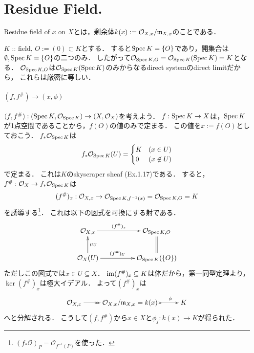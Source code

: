 \documentclass[a4paper]{jsarticle}
\newcommand{\shO}{\mathcal{O}}
\begin{document}
\section{Residue Field.} %
    Residue field of $x$ on $X$とは，剰余体$k(x):=\shO_{X,x}/\I{m}_{X,x}$のことである．

    $K$ :: field, $O:=(0) \subset K$とする．
    すると$\operatorname{Spec} K=\{O\}$であり，開集合は$\emptyset, \operatorname{Spec} K=\{O\}$の二つのみ．
    したがって$\shO_{\Spec K, O}=\shO_{\Spec K}(\Spec K)=K$となる．
    $\shO_{\Spec K, O}$は$\shO_{\Spec K}(\Spec K)$のみからなるdirect systemのdirect limitだから，
    これらは厳密に等しい．
    
    \paragraph{$(f,f^{\#}) \to (x, \phi)$}
    $(f, f^{\#}): (\Spec K, \shO_{\Spec K}) \to (X, \shO_X)$を考えよう．
    $f: \operatorname{Spec} K \to X$は，$\operatorname{Spec} K$が1点空間であることから，$f(O)$の値のみで定まる．
    この値を$x:=f(O)$としておこう．
    $f_* \shO_{\Spec K}$は
    \[
        f_* \shO_{\Spec K}(U)=
        \begin{cases}{}
            K & (x \in U) \\
            0 & (x \not \in U)
        \end{cases}
    \]
    で定まる．
    これは$K$のskyscraper sheaf (Ex.1.17)である．
    すると，$f^{\#}: \shO_X \to f_* \shO_{\Spec K}$は
    \[ (f^{\#})_{x}: \shO_{X,x} \to \shO_{\Spec K,f^{-1}(x)}=\shO_{\Spec K,O}=K \]
    を誘導する\footnote{$(f_* \shO)_P=\shO_{f^{-1}(P)}$を使った．}．
    これは以下の図式を可換にする射である．
    \[
    \xymatrix@C=5em
    {
    \shO_{X,x} \ar[r]^-{(f^{\#})_{x}} & \shO_{\Spec K,O} \\
    \shO_X(U) \ar[r]^-{(f^{\#})_U} \ar[u]_-{\mu_U} & \shO_{\Spec K}(\{O\}) \ar@{=}[u]
    }
    \]
    ただしこの図式では$x \in U \subseteq X$．
    $\operatorname{im} (f^{\#})_{x} \subseteq K$は体だから，第一同型定理より，$\ker (f^{\#})_{x}$は極大イデアル．
    よって$(f^{\#})_{x}$は
    \[ \xymatrix{ \shO_{X,x} \ar@{->>}[r]& \shO_{X,x}/\I{m}_{X,x}=k(x)~ \ar@{>->}[r]^-{\phi} & K } \]
    へと分解される．
    こうして$(f,f^{\#})$から$x \in X$と$\phi_f: k(x) \to K$が得られた．
\end{document}
